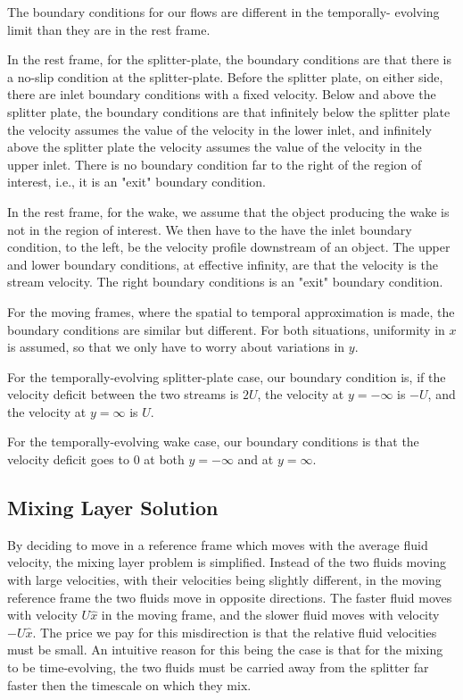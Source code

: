 \documentclass{article}
\begin{document}
The boundary conditions for our flows are different in the temporally-
	evolving limit than they are in the rest frame.

In the rest frame, for the splitter-plate, the boundary conditions are that
	there is a no-slip condition at the splitter-plate.
Before the splitter plate, on either side, there are inlet boundary
	conditions with a fixed velocity.
Below and above the splitter plate, the boundary conditions are that
	infinitely below the splitter plate the velocity
	assumes the value of the velocity in the lower inlet,
	and infinitely above the splitter plate the velocity
	assumes the value of the velocity in the upper inlet.
There is no boundary condition far to the right of the region of interest,
	i.e., it is an "exit" boundary condition.

In the rest frame, for the wake, we assume that the object producing the
	wake is not in the region of interest.
We then have to the have the inlet boundary condition, to the left,
	be the velocity profile downstream of an object.
The upper and lower boundary conditions, at effective infinity, 
	are that the velocity is the stream velocity.
The right boundary conditions is an "exit" boundary condition.

For the moving frames, where the spatial to temporal approximation is made,
	the boundary conditions are similar but different.
For both situations, uniformity in $x$ is assumed, so that we only
	have to worry about variations in $y$.

For the temporally-evolving splitter-plate case, our boundary condition
	is, if the velocity deficit between the two streams is $2 U$,
	the velocity at $y=-\infty$ is $-U$, and the velocity at
	$y = \infty$ is $U$.

For the temporally-evolving wake case, our boundary conditions is that
	the velocity deficit goes to $0$ at both $y = -\infty$ and 
	at $y=\infty$.

\subsection{Mixing Layer Solution}

By deciding to move in a reference frame which moves with the average fluid
	velocity, the mixing layer problem is simplified.
Instead of the two fluids moving with large velocities, with their velocities
	being slightly different, in the moving reference frame the two fluids 
	move in opposite directions.
The faster fluid moves with velocity $U\hat{x}$ in the moving
	frame, and the slower fluid moves with velocity $-U\hat{x}$.
The price we pay for this misdirection is that the relative fluid velocities
	must be small.
An intuitive reason for this being the case is that for the mixing
	to be time-evolving, the two fluids must be carried away from the
	splitter far faster then the timescale on which they mix.
\end{document}
